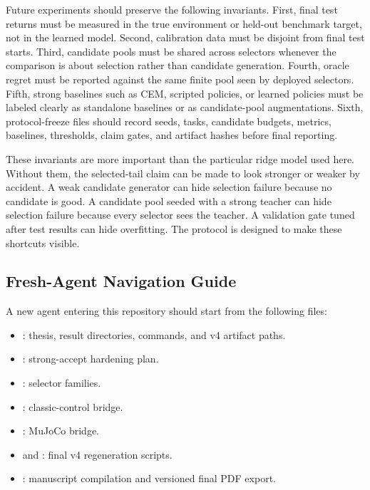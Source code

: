 \documentclass{article}
\begin{document}
Future experiments should preserve the following invariants. First, final test
returns must be measured in the true environment or held-out benchmark target,
not in the learned model. Second, calibration data must be disjoint from final
test starts. Third, candidate pools must be shared across selectors whenever
the comparison is about selection rather than candidate generation. Fourth,
oracle regret must be reported against the same finite pool seen by deployed
selectors. Fifth, strong baselines such as CEM, scripted policies, or learned
policies must be labeled clearly as standalone baselines or as candidate-pool
augmentations. Sixth, protocol-freeze files should record seeds, tasks,
candidate budgets, metrics, baselines, thresholds, claim gates, and artifact
hashes before final reporting.

These invariants are more important than the particular ridge model used here.
Without them, the selected-tail claim can be made to look stronger or weaker by
accident. A weak candidate generator can hide selection failure because no
candidate is good. A candidate pool seeded with a strong teacher can hide
selection failure because every selector sees the teacher. A validation gate
tuned after test results can hide overfitting. The protocol is designed to make
these shortcuts visible.

\subsection{Fresh-Agent Navigation Guide}

A new agent entering this repository should start from the following files:
\begin{itemize}
    \item {}: thesis, result directories, commands, and v4
    artifact paths.
    \item {}: strong-accept hardening plan.
    \item {}: selector families.
    \item {}: classic-control
    bridge.
    \item {}: MuJoCo bridge.
    \item {} and
    : final v4 regeneration
    scripts.
    \item {}: manuscript compilation and versioned
    final PDF export.
\end{itemize}
\end{document}
